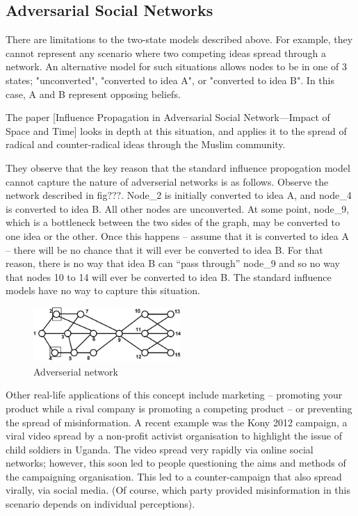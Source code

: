\subsection{Adversarial Social Networks}

 There are limitations to the two-state models described above. For example, they cannot represent any scenario where two competing ideas spread through a network. An alternative model for such situations allows nodes to be in one of 3 states; "unconverted", "converted to idea A", or "converted to idea B". In this case, A and B represent opposing beliefs.

The paper [Influence Propagation in Adversarial Social Network—Impact of Space and Time] looks in depth at this situation, and applies it to the spread of radical and counter-radical ideas through the Muslim community.

They observe that the key reason that the standard influence propogation model cannot capture the nature of adverserial networks is as follows. Observe the network described in fig???. Node\_2 is initially converted to idea A, and node\_4 is converted to idea B. All other nodes are unconverted. At some point, node\_9, which is a bottleneck between the two sides of the graph, may be converted to one idea or the other. Once this happens -- assume that it is converted to idea A -- there will be no chance that it will ever be converted to idea B. For that reason, there is no way that idea B can ``pass through'' node\_9 and so no way that nodes 10 to 14 will ever be converted to idea B. The standard influence models have no way to capture this situation.

\begin{figure}[htbp]
\centering
\includegraphics[width=0.5\textwidth]{./img/adversial_network.png}
\caption{Adverserial network}
\label{fig:adverserial_network}
\end{figure}

Other real-life applications of this concept include marketing -- promoting your product while a rival company is promoting a competing product -- or preventing the spread of misinformation. A recent example was the Kony 2012 campaign, a viral video spread by a non-profit activist organisation to highlight the issue of child soldiers in Uganda. The video spread very rapidly via online social networks; however, this soon led to people questioning the aims and methods of the campaigning organisation. This led to a counter-campaign that also spread virally, via social media. (Of course, which party provided misinformation in this scenario depends on individual perceptions).

